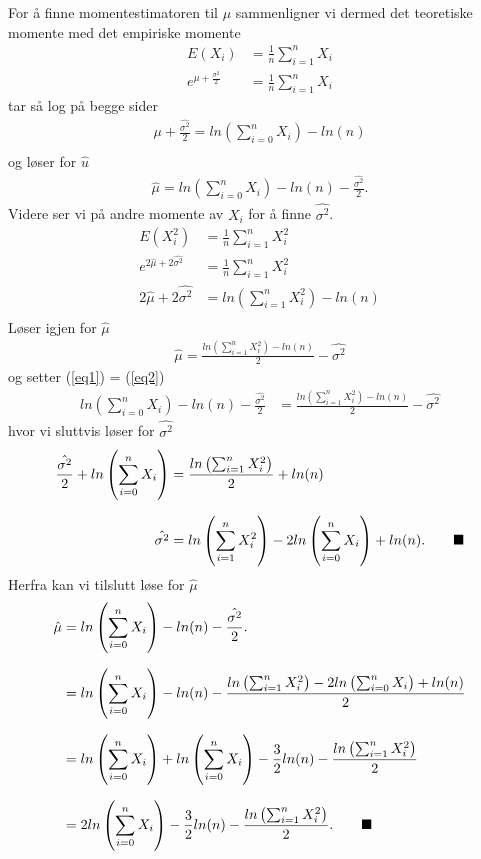 \documentclass[12pt,
               a4paper,
               article,
               oneside,
               oldfontcommands,
               norsk]{memoir}
\newcommand{\Q}{ \qquad \hfill \blacksquare}
\let\oldref\ref
\renewcommand{\ref}[1]{(\oldref{#1})}
\begin{document}
For å finne momentestimatoren til $\mu$ sammenligner vi dermed det teoretiske momente med det empiriske momente
\begin{align*}
    E(X_{i}) &= \frac{1}{n}\sum_{i=1}^{n} X_{i} \\[5pt]
    e^{\mu + \frac{\sigma^2}{2}} &= \frac{1}{n}\sum_{i=1}^{n} X_{i}
\end{align*}
tar så log på begge sider
\begin{align*}
    \mu + \frac{\hat{\sigma^2}}{2} = ln \left(\sum_{i=0}^{n} X_i \right) - ln(n) \\[5pt]
\end{align*}
og løser for $\hat{u}$
\begin{align}
    \label{eq1}
    \hat{\mu} = ln \left(\sum_{i=0}^{n} X_i \right) - ln(n) - \frac{\hat{\sigma^2}}{2}.
\end{align}
Videre ser vi på andre momente av $X_i$ for å finne $\hat{\sigma^2}$.
\begin{align*}
    E(X_{i}^2) &= \frac{1}{n} \sum_{i = 1}^{n} X_{i}^2 \\[7pt]
    e^{2\hat{\mu} + 2\hat{\sigma^2}} &= \frac{1}{n} \sum_{i = 1}^{n} X_{i}^2 \\[7pt]
    2\hat{\mu} + 2\hat{\sigma^2} &= ln \left( \sum_{i = 1}^{n} X_{i}^2 \right) - ln(n) \\[7pt]
\end{align*}
Løser igjen for $\hat{\mu}$
\begin{align}
    \label{eq2}
    \hat{\mu} = \frac{ln \left( \sum_{i = 1}^{n} X_{i}^2 \right) - ln(n)}{2} - \hat{\sigma^2}
\end{align}
og setter \ref{eq1} = \ref{eq2}
\begin{align*}
    ln \left(\sum_{i=0}^{n} X_i \right) - ln(n) - \frac{\hat{\sigma^2}}{2} &=  \frac{ln \left( \sum_{i = 1}^{n} X_{i}^2 \right) - ln(n)}{2} - \hat{\sigma^2}
\end{align*}
hvor vi sluttvis løser for $\hat{\sigma^2}$
\begin{align*}
\frac{\hat{\sigma^2}}{2} + ln \left(\sum_{i=0}^{n} X_i \right) &=  \frac{ln \left( \sum_{i = 1}^{n} X_{i}^2 \right)}{2} + ln(n)\\[7pt]
\hat{\sigma^2} &= ln \left( \sum_{i = 1}^{n} X_{i}^2 \right) - 2 ln \left(\sum_{i=0}^{n} X_i \right) + ln(n). \Q
\end{align*}
Herfra kan vi tilslutt løse for $\hat{\mu}$
\begin{align*}
    \hat{\mu} &= ln \left(\sum_{i=0}^{n} X_i \right) - ln(n) - \frac{\hat{\sigma^2}}{2}.\\[7pt]
    &= ln \left(\sum_{i=0}^{n} X_i \right) - ln(n) - \frac{ln \left( \sum_{i = 1}^{n} X_{i}^2 \right) - 2 ln \left(\sum_{i=0}^{n} X_i \right) + ln(n)}{2} \\[7pt]
    &= ln \left(\sum_{i=0}^{n} X_i \right) + ln \left(\sum_{i=0}^{n} X_i \right) - \frac{3}{2}ln(n) - \frac{ln \left( \sum_{i = 1}^{n} X_{i}^2 \right)}{2} \\[7pt]
    &= 2ln \left(\sum_{i=0}^{n} X_i \right) - \frac{3}{2}ln(n) - \frac{ln \left( \sum_{i = 1}^{n} X_{i}^2 \right)}{2}. \Q
\end{align*}
\end{document}
